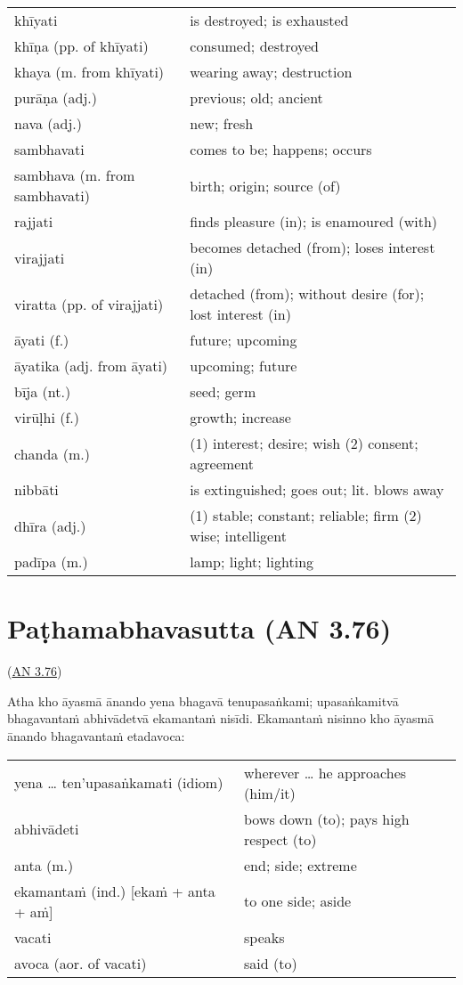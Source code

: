 \documentclass[11pt,oneside]{memoir}
\begin{document}
\begin{longtable}{L{\colOne} L{\colTwo}}
khīyati & is destroyed; is exhausted\\[0pt]
khīṇa (pp. of khīyati) & consumed; destroyed\\[0pt]
khaya (m. from khīyati) & wearing away; destruction\\[0pt]
purāṇa (adj.) & previous; old; ancient\\[0pt]
nava (adj.) & new; fresh\\[0pt]
sambhavati & comes to be; happens; occurs\\[0pt]
sambhava (m. from sambhavati) & birth; origin; source (of)\\[0pt]
rajjati & finds pleasure (in); is enamoured (with)\\[0pt]
virajjati & becomes detached (from); loses interest (in)\\[0pt]
viratta (pp. of virajjati) & detached (from); without desire (for); lost interest (in)\\[0pt]
āyati (f.) & future; upcoming\\[0pt]
āyatika (adj. from āyati) & upcoming; future\\[0pt]
bīja (nt.) & seed; germ\\[0pt]
virūḷhi (f.) & growth; increase\\[0pt]
chanda (m.) & (1) interest; desire; wish (2) consent; agreement\\[0pt]
nibbāti & is extinguished; goes out; lit. blows away\\[0pt]
dhīra (adj.) & (1) stable; constant; reliable; firm (2) wise; intelligent\\[0pt]
padīpa (m.) & lamp; light; lighting\\[0pt]
\end{longtable}

\chapter{Paṭhamabhavasutta (AN 3.76)}
\label{sec:orge04d506}

(\href{https://suttacentral.net/an3.76/pli/ms}{AN 3.76})

\begin{spacedquote}
Atha kho āyasmā ānando yena bhagavā tenupasaṅkami; upasaṅkamitvā bhagavantaṁ
abhivādetvā ekamantaṁ nisīdi. Ekamantaṁ nisinno kho āyasmā ānando bhagavantaṁ
etadavoca:
\end{spacedquote}

\begin{longtable}{L{\colOne} L{\colTwo}}
yena \ldots{} ten'upasaṅkamati (idiom) & wherever \ldots{} he approaches (him/it)\\[0pt]
abhivādeti & bows down (to); pays high respect (to)\\[0pt]
anta (m.) & end; side; extreme\\[0pt]
ekamantaṁ (ind.) [ekaṁ + anta + aṁ] & to one side; aside\\[0pt]
vacati & speaks\\[0pt]
avoca (aor. of vacati) & said (to)\\[0pt]
\end{longtable}
\end{document}
